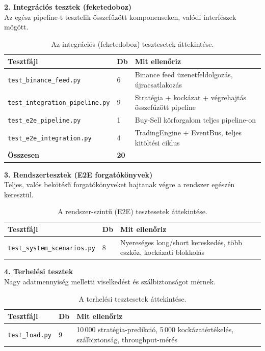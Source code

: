 \noindent\textbf{2. Integrációs tesztek (feketedoboz)}\\
Az egész pipeline-t tesztelik összefűzött komponenseken, valódi
interfészek mögött.

\begin{table}[H]
  \centering
  \small
  \begin{tabular}{|p{4.8cm}|l|p{6.7cm}|}
    \hline
    \textbf{Tesztfájl} & \textbf{Db} & \textbf{Mit ellenőriz} \\
    \hline\hline
    \texttt{test\_binance\_feed.py}       & 6 & Binance feed üzenetfeldolgozás, újracsatlakozás \\
    \texttt{test\_integration\_pipeline.py}& 9 & Stratégia + kockázat + végrehajtás összefűzött pipeline \\
    \texttt{test\_e2e\_pipeline.py}       & 1 & Buy-Sell körforgalom teljes pipeline-on \\
    \texttt{test\_e2e\_integration.py}    & 4 & TradingEngine + EventBus, teljes kitöltési ciklus \\
    \hline
    \textbf{Összesen} & \textbf{20} & \\
    \hline
  \end{tabular}
  \caption{Az integrációs (feketedoboz) tesztesetek áttekintése.}
  \label{tab:integration_tests}
\end{table}

\noindent\textbf{3. Rendszertesztek (E2E forgatókönyvek)}\\
Teljes, valós bekötésű forgatókönyveket hajtanak végre a rendszer
egészén keresztül.

\begin{table}[H]
  \centering
  \small
  \begin{tabular}{|p{4.8cm}|l|p{6.7cm}|}
    \hline
    \textbf{Tesztfájl} & \textbf{Db} & \textbf{Mit ellenőriz} \\
    \hline\hline
    \texttt{test\_system\_scenarios.py} & 8 & Nyereséges long/short kereskedés, több eszköz, kockázati blokkolás \\
    \hline
  \end{tabular}
  \caption{A rendszer-szintű (E2E) tesztesetek áttekintése.}
  \label{tab:system_tests}
\end{table}

\noindent\textbf{4. Terhelési tesztek}\\
Nagy adatmennyiség melletti viselkedést és szálbiztonságot mérnek.

\begin{table}[H]
  \centering
  \small
  \begin{tabular}{|p{4.8cm}|l|p{6.7cm}|}
    \hline
    \textbf{Tesztfájl} & \textbf{Db} & \textbf{Mit ellenőriz} \\
    \hline\hline
    \texttt{test\_load.py} & 9 & 10\,000 stratégia-predikció, 5\,000 kockázatértékelés, szálbiztonság, throughput-mérés \\
    \hline
  \end{tabular}
  \caption{A terhelési tesztesetek áttekintése.}
  \label{tab:load_tests}
\end{table}

